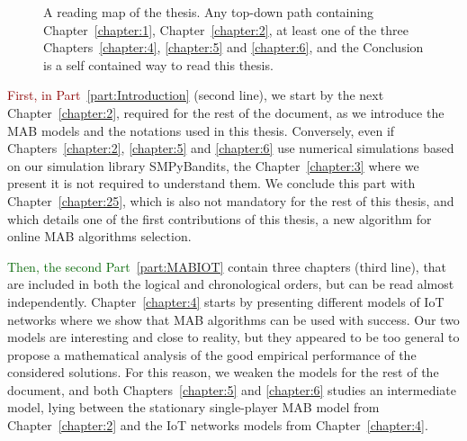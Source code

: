 \begin{figure}[h!]
{
    }
    \caption[Organization of the thesis: a reading map]{A reading map of the thesis. Any top-down path containing Chapter~\ref{chapter:1}, Chapter~\ref{chapter:2}, at least one of the three Chapters~\ref{chapter:4}, \ref{chapter:5} and \ref{chapter:6}, and the Conclusion is a self contained way to read this thesis.}
    \label{fig:1:organization}
\end{figure}

\textcolor{darkred}{First, in Part~\ref{part:Introduction}} (second line), we start by the next Chapter~\ref{chapter:2}, required for the rest of the document, as we introduce the MAB models and the notations used in this thesis.
Conversely, even if Chapters~\ref{chapter:2}, \ref{chapter:5} and \ref{chapter:6} use numerical simulations based on our simulation library SMPyBandits, the Chapter~\ref{chapter:3} where we present it is not required to understand them.
We conclude this part with Chapter~\ref{chapter:25}, which is also not mandatory for the rest of this thesis, and which details one of the first contributions of this thesis, a new algorithm for online MAB algorithms selection.

\textcolor{darkgreen}{Then, the second Part~\ref{part:MABIOT}} contain three chapters (third line), that are included in both the logical and chronological orders, but can be read almost independently.
Chapter~\ref{chapter:4} starts by presenting different models of IoT networks where we show that MAB algorithms can be used with success. Our two models are interesting and close to reality, but they appeared to be too general to propose a mathematical analysis of the good empirical performance of the considered solutions.
For this reason, we weaken the models for the rest of the document,
and both Chapters~\ref{chapter:5} and \ref{chapter:6} studies an intermediate model, lying between the stationary single-player MAB model from Chapter~\ref{chapter:2} and the IoT networks models from Chapter~\ref{chapter:4}.


